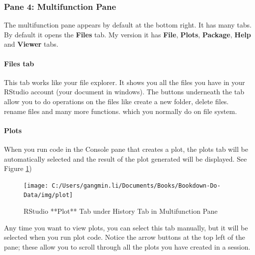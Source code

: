 \documentclass[
]{book}
\begin{document}
\hypertarget{pane-4-multifunction-pane}{%
\subsubsection*{Pane 4: Multifunction Pane}\label{pane-4-multifunction-pane}}


The multifunction pane appears by default at the bottom right. It has many tabs. By default it opens the \textbf{Files} tab. My version it has \textbf{File}, \textbf{Plots}, \textbf{Package}, \textbf{Help} and \textbf{Viewer} tabs.

\hypertarget{files-tab}{%
\paragraph{\texorpdfstring{\textbf{Files tab}}{Files tab}}\label{files-tab}}

This tab works like your file explorer. It shows you all the files you have in your RStudio account (your document in windows). The buttons underneath the tab allow you to do operations on the files like create a new folder, delete files. rename files and many more functions. which you normally do on file system.

\hypertarget{plots}{%
\paragraph{\texorpdfstring{\textbf{Plots}}{Plots}}\label{plots}}

When you run code in the Console pane that creates a plot, the plots tab will be automatically selected and the result of the plot generated will be displayed. See Figure \ref{fig:plot})

\begin{figure}

{\centering \texttt{[image: C:/Users/gangmin.li/Documents/Books/Bookdown-Do-Data/img/plot]} 

}

\caption{RStudio **Plot** Tab under History Tab in Multifunction Pane}\label{fig:plot}
\end{figure}

Any time you want to view plots, you can select this tab manually, but it will be selected when you run plot code. Notice the arrow buttons at the top left of the pane; these allow you to scroll through all the plots you have created in a session.
\end{document}
